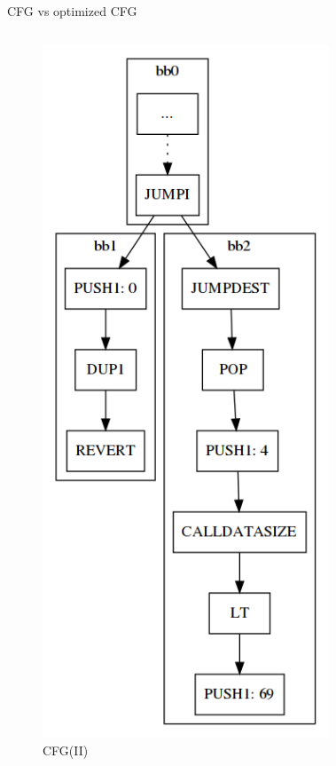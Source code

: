\documentclass[11pt]{beamer}
\begin{document}
\begin{frame}{CFG vs optimized CFG}
\begin{columns}
\begin{figure}
    \includegraphics[scale=0.2]{figures/cfg_normal_2.png}
    \caption{CFG(II)}
\end{figure}
\begin{figure}
    \centering

\end{figure}
\end{columns}
\end{frame}
\end{document}
